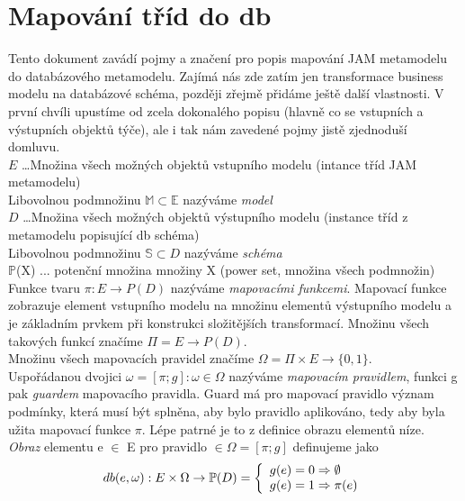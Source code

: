 \documentclass{article}
\begin{document}
 
\section{Mapování tříd do db}

Tento dokument zavádí pojmy a značení pro popis mapování JAM metamodelu do
databázového metamodelu. Zajímá nás zde zatím jen transformace business
modelu na databázové schéma, později zřejmě přidáme ještě další
vlastnosti. V první chvíli upustíme od zcela dokonalého popisu (hlavně co se
vstupních a výstupních objektů týče), ale i tak nám zavedené pojmy jistě
zjednoduší domluvu.\\


$E$ \ldots Množina všech možných objektů vstupního
modelu (intance tříd JAM metamodelu)\\

Libovolnou podmnožinu $\mathbb{M} \subset \mathbb{E}$ nazýváme
\textit{model}\\

$D$ \ldots Množina všech možných objektů výstupního modelu (instance tříd z
metamodelu popisující db schéma)\\

Libovolnou podmnožinu $\mathbb{S} \subset D$ nazýváme \textit{schéma}\\

$\mathbb{P}$(X) ... potenční množina množiny X (power set, množina všech
podmnožin) \\

Funkce tvaru $\pi : E \to P(D)$ nazýváme \textit{mapovacími funkcemi}.
Mapovací funkce zobrazuje element vstupního modelu na množinu elementů
výstupního modelu a je základním prvkem při konstrukci složitějších
transformací. Množinu všech takových funkcí značíme $\Pi = E \to P(D)$.\\

Množinu všech mapovacích pravidel značíme $\Omega = \Pi \times E \to \{0,1\}$.\\


Uspořádanou dvojici $\omega = [\pi; g] : \omega \in \Omega$
nazýváme \textit{mapovacím pravidlem}, funkci g pak \textit{guardem} mapovacího
pravidla. Guard má pro mapovací pravidlo význam podmínky, která musí být splněna,
aby bylo pravidlo aplikováno, tedy aby byla užita mapovací funkce $\pi$. Lépe
patrné je to z definice obrazu elementů níze.\\

\textit{Obraz} elementu e $\in$ E pro pravidlo $ \in \Omega = [\pi; g] $
 definujeme jako
 \[
  db(e, \omega) : E \times \Omega \to \mathbb{P}(D) = \left\{
  \begin{array}{l l}
    g(e) = 0 \Rightarrow \emptyset \\
    g(e) = 1 \Rightarrow  \pi(e)
  \end{array}\right.
\]
\end{document}
